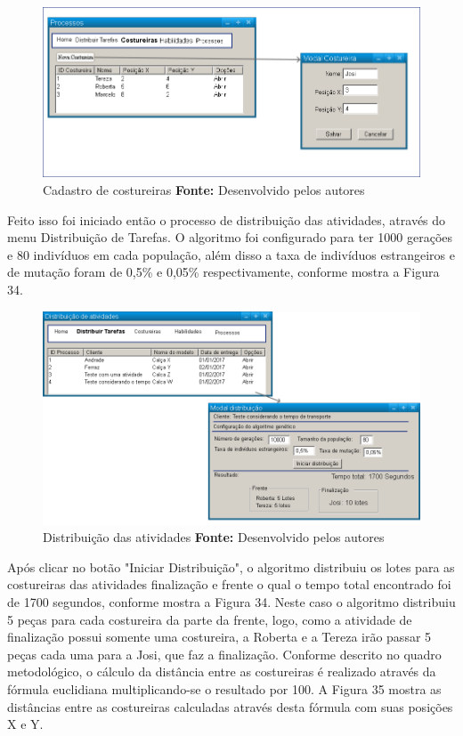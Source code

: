 \begin{figure}[h!]
	\centerline{\includegraphics[scale=0.3]{./imagens/test_case_2_costureiras.png}}
	\caption[Cadastro de costureiras]
	{Cadastro de costureiras \textbf{Fonte:} Desenvolvido pelos autores}
	\label{fig:exemplo1}
\end{figure}

\par \par Feito isso foi iniciado então o processo de distribuição das atividades, através do menu Distribuição de Tarefas.
O algoritmo foi configurado para ter 1000 gerações e 80 indivíduos em cada população, além disso a taxa de indivíduos
estrangeiros e de mutação foram de 0,5\% e 0,05\% respectivamente, conforme
mostra a Figura 34.

\begin{figure}[h!]
	\centerline{\includegraphics[scale=0.3]{./imagens/test_case2_distribuicao.png}}
	\caption[Distribuição das atividades]
	{Distribuição das atividades \textbf{Fonte:} Desenvolvido pelos autores}
	\label{fig:exemplo1}
\end{figure}

\par Após clicar no botão "Iniciar Distribuição", o algoritmo distribuiu os lotes para as costureiras das atividades
 finalização e frente o qual o tempo total encontrado foi de 1700 segundos,
 conforme mostra a Figura 34. Neste caso o algoritmo distribuiu 5 peças para cada costureira da parte da frente, logo, como a atividade de finalização possui somente uma costureira,
 a Roberta e a Tereza irão passar 5 peças cada uma para a Josi, que faz a
 finalização. Conforme descrito no quadro metodológico, o cálculo da distância entre as costureiras é realizado através da fórmula euclidiana multiplicando-se o resultado por 100.
 A Figura 35 mostra as distâncias entre as costureiras calculadas através desta
 fórmula com suas posições X e Y.
  
